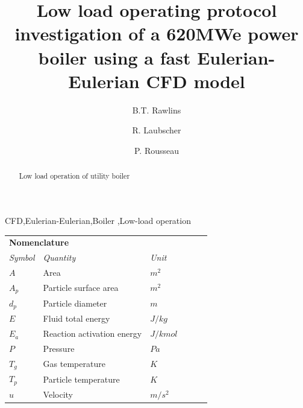 \documentclass[review]{elsarticle}
\begin{document}
\begin{frontmatter}

\title{Low load operating protocol investigation of a 620MWe power boiler using a fast Eulerian-Eulerian CFD model}

\author{B.T. Rawlins}
\author{R. Laubscher}
\author{P. Rousseau}
\address{Department of Mechanical Engineering, Applied Thermal-Fluid Process Modeling Research Unit, University of Cape Town, Library Rd, Rondebosch, Cape Town, 7701, South Africa}

\begin{abstract}

Low load operation of utility boiler

\end{abstract}

\begin{keyword}
CFD\sep Eulerian-Eulerian\sep Boiler \sep Low-load operation
\end{keyword}

\end{frontmatter}

\linenumbers

\begin{center}
\begin{tabular}{|p{}p{}p{}p{}p{}p{}|} 
 \hline
\multicolumn{3}{|l}{\textbf{Nomenclature}} & &  &\\
\textit{Symbol} & \textit{Quantity} & \textit{Unit} & & &\\
$A$ &  Area & $m^2$ & & &\\
$A_p$ & Particle surface area & $m^2$& & & \\
$d_p$&Particle diameter & $m$ & & & \\
$E$& Fluid total energy&$J/kg$ & & & \\
$E_a$& Reaction activation energy&$J/kmol$ & & & \\
$P$& Pressure & $Pa$ & & & \\
$T_g$& Gas temperature& $K$ & & & \\
$T_p$&Particle temperature & $K$& & & \\
$u$& Velocity &$m/s^2$ & & &\\
\hline
\end{tabular}
\end{center}
\end{document}
